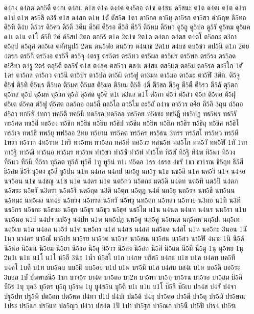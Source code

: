 {ด4กง
ด4กด
ดก5ดื
ด4กเ
ด4กแ
ด1ข
ด1ค
ดง4ค
ดง5ออ
ด1ช
ด4ชน
ด5ชนะ
ด1ด
ด4ดเ
ด1ต
ด1ท
ด1ป
ด1พ
ดร5ลิ
ด3ร้
ด1ส
ด4สก
ด1ห
1ดั
ดัส5ต
1ดา
ดา5กอ
ดา5มุ
ดา5รก
ดา5สว
ดำ5ฤษ
ดิ5ทอ
ดิ5ทิ
ดิ4บ
ดิ5วร
ดิ5ศว
ดี5ดี
3ดีน
ดี5ฝ่
ดี5รอ
ดี5ลิ
ดี5วี
ดี5หม
ดี5หว
ดู5ถู
ดู5ปอ
ดู5รั
ดู5หม
ดู5แค
ด1เ
ด1แ
ด1โ
ด้5ยิ
2ด์
ด์5สป
2ตก
ตก5ร้
ต1ค
2ต1ช
2ต1ต
ต4ตภ
ต4ตส
ต4ตโ
ต5ถกะ
ต3ถา
ต5ถุป
ต5ถุศ
ตถ5เล
ตทัศนูป5
2ตน
ตน5ฟอ
ตน5วร
ต4นาธ
2ต1บ
ต4บช
ตบ5ชว
ตป5นี
ต1ภ
2ตย
4ตรก
ตร5กิ
ตร5งอ
ตร5จี
ตร5จุ
4ตรฐ
ตร5ตร
ตร5ทว
ตร5ผล
ตร5ฝร
ตร5พล
ตร5รง
ตร5ลด
ต5ริยา
ต4รู
2ตร์
ตฤ5ตี
ตล5รั
ต1ส
ต4สค
ตส5วา
ตส4เ
ต4สแ
ตส5แต
ตอ5ม่
ตอ5รอ
ตะ5ใภ
1ตั
1ตา
ตา5กล
ตา5กว
ตา5นึ
ตา5ปร
ตา5ปล
ตา5ผิ
ตา5ฟู
ตา3มห
ตา5มอ
ตา5มะ
ตา5ฬี
3ติก.
ติ5จู
ติ5ช่
ติ5ทิ
ติ5นร
ติ5บอ
ติ5มศ
ติ5มส
ติ5มอ
ติ5ยม
ติ5อิ
4ติ์
ตี5ขล
ตี5คู
ตี5ตื
ตี5รว
ตี5ลั
ตุ5ตถ
ตุ5ทส
ตุ5ป่
ตุ5มห
ตุ5รก
ตุ5ลั
ตุ5สด
ตู5ดิ
ต1เ
ต3แล
ต1โ
ต่5ถา
ต่5ว่
ต่5สว
ต้5ก๋
ต้5ตอ
ต้5ฝุ
ต๋5เต
ต์5คล
ต์5ฟู
ต์5ศต
ถด5ถอ
ถม5ถื
ถล5ไถ
ถว5ไม
ถะ5ถั
ถ4าธ
ถา5วร
ถ4ีย
ถี5ลิ
3ถุน
ถ่5ถอ
ถ่5ถา
ทก5ซั
4ทกา
ทค5ติ
ทค5นี
ทด5รอ
ทด5ลอ
ทธ5คย
ท5ธชะ
ทธ5ฎี
ทธ5ปฏ
ทธ5พร
ทธ5รั
ทธ5ศต
ทธ5สี
ทธ5อง
ท5ธิก
ท5ธิช
ท5ธิบ
ท5ธิป
ท5ธิผ
ท5ธิพ
ท5ธิภ
ท5ธิร
ท5ธิฤ
ท5ธิศ
ท5ธิโ
ทธ5เจ
ทพ5ธิ
ทพ5ยุ
ทฟ5ลอ
2ทย
ท5ยาน
ทร5คต
ทร5คร
ทร5ธน
3ทรร
ทร5สโ
ทร5หว
ทร5หึ
1ทรา
ท5ราก
4ท5ราห
1ทรี
ทว5ทห
ทว5สถ
ทศ5ทิ
ทศ5วร
ทสน5ท
ทส5โก
ทห5วั
ทห5ฬิ
1ทั
1ทา
ทา5ฐิ
ทา5ฒิ
ทา5นอ
ทา5มร
ทา5รพ
ทำ5ขว
ทำ5ซ้
ทำ5ท่
ทำ5โท
ทิ5ฆั
ทิ5ฐิ
ทิ4พ
ทิ5พา
ทิ5วง
ที5นว
ที5นี
ที5รา
ทุ5คต
ทุ5ลั
ทุ5ศี
1ทู
ทู5น่
ท1เ
ท์5ดอ
1ธร
4ธรส
4ธรั
1ธา
ธา1รณ
ธิ5ฤท
ธิ5ศี
ธิ5สม
ธี5รี
ธุ5ดง
ธุ5ลี
ธู5ปน
น1ก
น4กค
น4กป
นก5ยู
นก5รู
น1ข
นข5ลิ
น1ค
นค5ริ
น1จ
น4จอ
นจ5อน
น1ช
น4ชญ
น1ซ
น1ด
น4ดร
น1ต
นต5กว
น5ตกะ
นต5ดิ
น4ตท
นต5ทิ
นต5ปิ
น4ตภ
น5ตระ
น5ตรั
น3ตรา
น5ต5ริ
นต5ฤด
น3ติ
น5ตุก
น5ตุฏ
น4ต์
นถ5ธุ
นถ5รจ
นท5ขี
นท5นน
น5ทนะ
นท5ผล
นท4ย
น5ทรง
น5ทรล
น5ทรั
น5ทรุ
นท5ฤก
น5ทลา
น5ทวย
น3ทอ
น1ทิ
น3ที
นธ5กร
น5ธกะ
น5ธนะ
น5ธุก
น5ธุร
น5ธุว
น5ธุศ
นธ5ไม
น1น
น4นต
น4นท
น4นร
นน5รา
น1บ
นบ5นอ
น1ป
น4ปจ
นป5จู
น4ปท
น1พ
นพ5ปฎ
นพ5ศู
นภ5ศู
น5ยนต
นฤ5คห
นฤ5ปเ
นฤ5เท
นฤ5เบ
น1ล
น4ลล
นว5ร่
น1ศ
นษ5กร
น1ส
น4สซ
น4สส
นส5แด
น4สโ
น1ห
นอ5กะ
3นอน
1นั
1นา
นา4คร
นา5ณั
นา5ปร
นา5รย
นา5วต
นา5วล
นา5สณ
นา5สน
นา5สว
นา5ฬิ
4นาะ
1นิ
นิ5ด้
นิ5ฟอ
นิ5มน
นิ5ยม
นิ5ยา
นิ5รอ
นิ5ลุ
นิ5วร
นิ5สง
นิ5สถ
นิ5สี
นิ5แด
นี5มี
นี5มู
1นุ
นุ5พย
1นู
2น1เ
น1แ
น1โ
น1ไ
น่5อี
3น้อ
1น้ำ
น์5สไ
บ1ก
บ4กษ
บกิส5
บ4กแ
บ1ข
บ1ค
บ4คท
บค5ที
บ4คโ
1บดี
บ1ท
บบ5ฉบ
บบ5ฝึ
บบ5อย
บ1ป
บ1พ
บร5มี
บ1ส
บ4สบ
บส4เ
บ1ห
บอ5ดี
บอ5ระ
3บอล
1บั
บัพพาชนี5
1บา
บาจ5ร
บา4ต
บา5ตอ
บา2ท
บา5ทา
บา5ทุ
บา5รน
บา5รอ
บา5สม
บี5คิ
บี5ร่
1บุ
บุค3
บุ5ตร
บุ5ถุ
บุ5รพ
1บู
บู4ช5น
บู5ติ
บ1เ
บ1แ
บ1โ
บ๊5จี
บ๊5เบ
ปก4ส
ป4จั
ป4จา
ปฐ5ปท
ปฐ5พี
ปต5ถก
ปต5พล
ป4ทา
ป1ป
ป4ปเ
ปม5ด้
ป4ยุ
ปร5ตอ
ปร5ตี
ปร5ตุ
ปร5ผั
ปร5ษณ
1ประ
ปร5แก
ปร5แท
ปล5ญว
ป4วา
ปส4ต
1ปั
1ปา
ปา5ฐก
ปา5ณก
ปา5นี
ปา5ปิ
ปาร4
ปา5รเ
}
